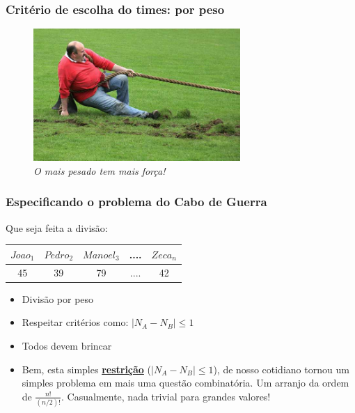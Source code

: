 \documentclass{beamer}
\begin{document}

\begin{frame}
\frametitle{Critério de escolha do times: por peso}

\begin{figure}[ht!]
 \centering
 \includegraphics[width=0.7\textwidth , height=0.7\textheight]{../figuras/separar_por_peso02.jpg}
\caption{\textit{O mais pesado tem mais força!}} 
\end{figure}

\end{frame}


\begin{frame}
\frametitle{Especificando o problema do Cabo de Guerra}

\begin{block}{Que seja feita a divisão:}


 
\begin{center}
\begin{tabular}{|c|c|c|c|c|}
\hline
$Joao_1$ & $Pedro_2$ & $Manoel_3$ & .... & $Zeca_n$ \\ \hline
45 & 39 & 79 & .... & 42  \\ \hline
\end{tabular}
\end{center}

\begin{itemize}
\item Divisão  por peso
\item Respeitar  critérios como: $|N_A - N_B| \le 1$
\item Todos devem brincar

\item \textsf{Bem, esta simples {\bf \underline{restrição}} ({\bf $|N_A - N_B| \le 1$}), de nosso cotidiano tornou um simples problema em mais uma questão combinatória.
 Um arranjo da ordem de  $\frac{n!}{(n/2)!}$.
 Casualmente, nada trivial  para grandes valores! }
 \end{itemize}
 
\end{block}
\end{frame}
\end{document}
